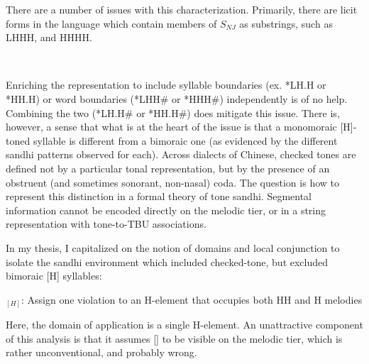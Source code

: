\documentclass{article}
\begin{document}
There are a number of issues with this characterization. Primarily, there are licit forms in the language which contain members of $S_{NJ}$ as substrings, such as LHHH, and HHHH.
\begin{exe}
\ex \
\begin{center}
\hspace{2cm}
\end{center}
\end{exe}
Enriching the representation to include syllable boundaries (ex. *LH.H or *HH.H) or word boundaries (*LHH\# or *HHH\#) independently is of no help. Combining the two (*LH.H\# or *HH.H\#) does mitigate this issue. There is, however, a sense that what is at the heart of the issue is that a monomoraic [H]-toned syllable is different from a bimoraic one (as evidenced by the different sandhi patterns observed for each). Across dialects of Chinese, checked tones are defined not by a particular tonal representation, but by the presence of an obstruent (and sometimes sonorant, non-nasal) coda. The question is how to represent this distinction in a formal theory of tone sandhi. Segmental information cannot be encoded directly on the melodic tier, or in a string representation with tone-to-TBU associations. 

In my thesis, I capitalized on the notion of domains and local conjunction to isolate the sandhi environment which included checked-tone, but excluded bimoraic [H] syllables:
\begin{exe}
\ex *[HH, H\textipa{P}]$_{[H]}$: Assign one violation  to an H-element that occupies both HH and H melodies
\end{exe}
Here, the domain of application is a single H-element. An unattractive component of this analysis is that it assumes [] to be visible on the melodic tier, which is rather unconventional, and probably wrong.
\end{document}
